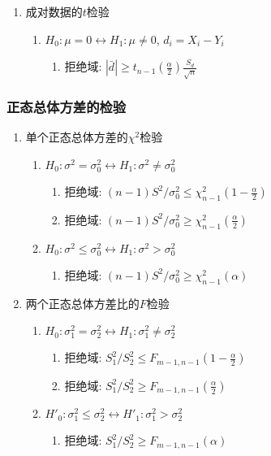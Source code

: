 \documentclass[10pt,a4paper,nofonts]{ctexart}
\renewcommand{\le}{\leqslant}
\renewcommand{\ge}{\geqslant}
\begin{document}
\begin{multicols}{2}
\begin{enumerate}
\item 成对数据的$t$检验
\begin{enumerate}
\item $H_0:\mu=0\leftrightarrow H_1:\mu\neq0$, $d_i=X_i-Y_i$
\begin{enumerate}
\item 拒绝域: $|\bar{d}|\ge t_{n-1}{(\frac{\alpha}{2})} \frac{S_d}{\sqrt{n}}$
\end{enumerate}
\end{enumerate}

\end{enumerate}

\subsubsection{正态总体方差的检验}

\begin{enumerate}

\item 单个正态总体方差的$\chi^2$检验
\begin{enumerate}
\item $H_0:\sigma^2=\sigma^2_0\leftrightarrow H_1:\sigma^2\neq\sigma^2_0$
\begin{enumerate}
\item 拒绝域: $(n-1)S^2/\sigma^2_0\le\chi^2_{n-1}(1-\frac{\alpha}{2})$
\item 拒绝域: $(n-1)S^2/\sigma^2_0\ge\chi^2_{n-1}(\frac{\alpha}{2})$
\end{enumerate}
\item $H_0:\sigma^2\le\sigma^2_0\leftrightarrow H_1:\sigma^2>\sigma^2_0$
\begin{enumerate}
\item 拒绝域: $(n-1)S^2/\sigma^2_0\ge\chi^2_{n-1}(\alpha)$
\end{enumerate}
\end{enumerate}

\item 两个正态总体方差比的$F$检验
\begin{enumerate}
\item $H_0:\sigma^2_1=\sigma^2_2\leftrightarrow H_1:\sigma^2_1\neq\sigma^2_2$
\begin{enumerate}
\item 拒绝域: $S^2_1/S^2_2\le F_{m-1,n-1}(1-\frac{\alpha}{2})$
\item 拒绝域: $S^2_1/S^2_2\ge F_{m-1,n-1}(\frac{\alpha}{2})$
\end{enumerate}
\item $H'_0:\sigma^2_1\le\sigma^2_2\leftrightarrow H'_1:\sigma^2_1>\sigma^2_2$
\begin{enumerate}
\item 拒绝域: $S^2_1/S^2_2\ge F_{m-1,n-1}(\alpha)$
\end{enumerate}
\end{enumerate}


\end{enumerate}
\end{multicols}
\end{document}
